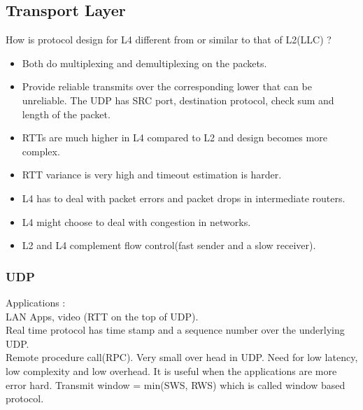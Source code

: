 \documentclass[solution,addpoints,12pt]{exam}
\begin{document}
\subsection{Transport Layer}
How is protocol design for L4 different from or similar to that
of L2(LLC) ?\\
\begin{itemize}
\item
Both do multiplexing and demultiplexing on the packets.
\item Provide reliable transmits over the corresponding lower
that can be unreliable. The UDP has SRC port, destination
protocol, check sum and length of the packet.
\item RTTs are much higher in L4 compared to L2 and design
becomes more complex.
\item RTT variance is very high and timeout estimation
is harder.
\item L4 has to deal with packet errors and packet drops
in intermediate routers.
\item L4 might choose to deal with congestion in networks.
\item L2 and L4 complement flow control(fast sender and a slow receiver).
\end{itemize}
\subsubsection{UDP}
Applications :\\
LAN Apps, video (RTT on the top of UDP).\\
Real time protocol has time stamp and a sequence number over
the underlying UDP.\\
Remote procedure call(RPC). Very small over head in UDP.
Need for low latency, low complexity and low overhead.
It is useful when the applications are more error hard.
Transmit window = min(SWS, RWS) which is called window based
protocol.\\
\end{document}
